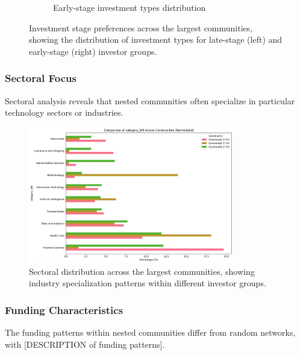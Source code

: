 \documentclass[12pt]{article}
\begin{document}
\begin{figure}[htbp]
\begin{subfigure}{0.48\textwidth}
    \caption{Early-stage investment types distribution}
    \label{fig:early_stage_types}
\end{subfigure}
\caption{Investment stage preferences across the largest communities, showing the distribution of investment types for late-stage (left) and early-stage (right) investor groups.}
\label{fig:investment_stage_distribution}
\end{figure}

\subsubsection{Sectoral Focus}

Sectoral analysis reveals that nested communities often specialize in particular technology sectors or industries.

\begin{figure}[htbp]
\centering
\includegraphics[width=0.8\textwidth]{./assets/sectorial-distribution.png}
\caption{Sectoral distribution across the largest communities, showing industry specialization patterns within different investor groups.}
\label{fig:sectoral_distribution}
\end{figure}

\subsubsection{Funding Characteristics}

The funding patterns within nested communities differ from random networks, with [DESCRIPTION of funding patterns].
\end{document}

